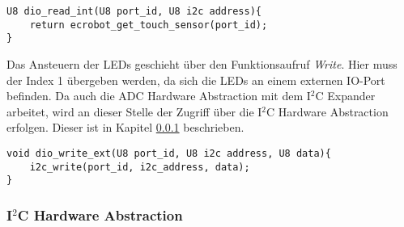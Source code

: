 \begin{lstlisting}[frame=single,caption={Aufruf der internen DIO-Read Funktion},captionpos=b]  
U8 dio_read_int(U8 port_id, U8 i2c address){
	return ecrobot_get_touch_sensor(port_id);
}
\end{lstlisting}\newline\newline
Das Ansteuern der LEDs geschieht über den Funktionsaufruf \textit{Write}. Hier muss der Index 1 übergeben werden, da sich die LEDs an einem externen IO-Port befinden. Da auch die ADC Hardware Abstraction mit dem I$^2$C Expander arbeitet, wird an dieser Stelle der Zugriff über die I$^2$C Hardware Abstraction erfolgen. Dieser ist in Kapitel \ref{i2cabstraction} beschrieben.

\begin{lstlisting}[frame=single,caption={Aufruf der I$^2$C Hardware Abstraction},captionpos=b]  
void dio_write_ext(U8 port_id, U8 i2c address, U8 data){
	i2c_write(port_id, i2c_address, data);
}
\end{lstlisting}\newline\newline
 

\subsubsection{I$^2$C Hardware Abstraction} \label{i2cabstraction}

